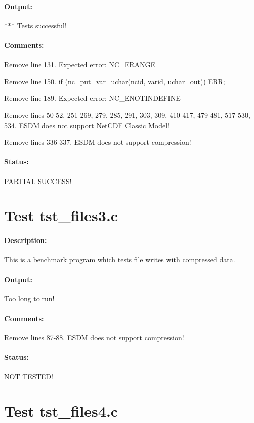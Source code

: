 \paragraph{Output:} *** Tests successful!

\paragraph{Comments:} Remove line 131. Expected error: NC\_ERANGE

Remove line 150. if (nc\_put\_var\_uchar(ncid, varid, uchar\_out)) ERR;

Remove line 189. Expected error: NC\_ENOTINDEFINE

Remove lines 50-52, 251-269, 279, 285, 291, 303, 309, 410-417, 479-481, 517-530, 534. ESDM does not support NetCDF Classic Model!

Remove lines 336-337. ESDM does not support compression!

\paragraph{Status:} PARTIAL SUCCESS!

{\color{blue}{Help, Julian!}}

\section{Test tst\_files3.c}

\paragraph{Description:} This is a benchmark program which tests file writes with compressed data.

\paragraph{Output:} Too long to run!

\paragraph{Comments:} Remove lines 87-88. ESDM does not support compression!

\paragraph{Status:} NOT TESTED!

\section{Test tst\_files4.c}

